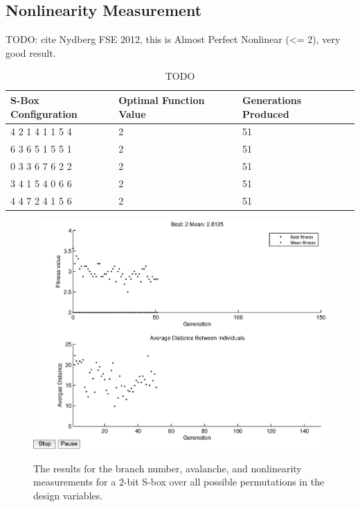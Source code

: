 \documentclass[11pt]{article}
\begin{document}
\subsection{Nonlinearity Measurement}

TODO: cite Nydberg FSE 2012, this is Almost Perfect Nonlinear (<= 2), very good result.

\begin{table}
	\centering
	\caption{TODO}
	\label{nlTable}
    \begin{tabular}{|l|l|l|}
        \hline
        S-Box Configuration & Optimal Function Value & Generations Produced \\ \hline
        4     2     1     4     1     1     5     4 & 2 & 51 \\ 
        6     3     6     5     1     5     5     1 & 2 & 51 \\ 
        0     3     3     6     7     6     2     2 & 2 & 51 \\ 
        3     4     1     5     4     0     6     6 & 2 & 51 \\ 
        4     4     7     2     4     1     5     6 & 2 & 51 \\ 
        \hline
    \end{tabular}
\end{table}

\begin{figure}
	\centering
	\includegraphics[scale=0.5]{images/nl_results16.eps} \\
	\label{nl16}
\caption{The results for the branch number, avalanche, and nonlinearity measurements for a $2$-bit S-box over all possible permutations in the design variables.}
\end{figure}
\end{document}
